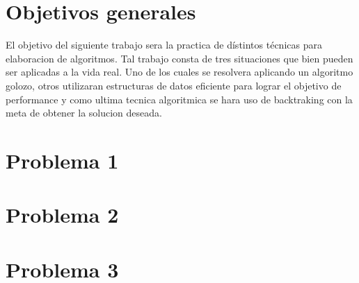 \documentclass[a4paper]{article}
\begin{document}
\thispagestyle{empty}

\maketitle
\newpage

\thispagestyle{empty}
\vfill

\thispagestyle{empty}
\vspace{1.5cm}
\tableofcontents
\newpage


\newpage
\section{Objetivos generales}

El objetivo del siguiente trabajo sera la practica de dístintos técnicas para elaboracion de algoritmos.
Tal trabajo consta de tres situaciones que bien pueden ser aplicadas a la vida real. 
Uno de los cuales se resolvera aplicando un algoritmo golozo, otros
utilizaran estructuras de datos eficiente para lograr el objetivo de performance y como ultima tecnica algoritmica se hara uso de backtraking
con la meta de obtener la solucion deseada.  



\section{Problema 1}


\newpage
\section{Problema 2}


\newpage
\section{Problema 3}



\newpage
\end{document}
